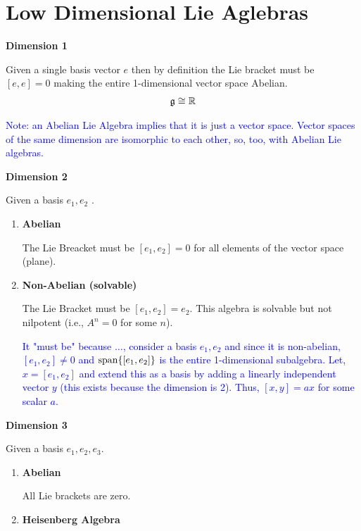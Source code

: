 \documentclass[12pt,a4paper]{report}
\newcommand{\BLUE}[1]{\textcolor{blue}{#1}}
\begin{document}
\chapter{Low Dimensional Lie Aglebras}

\begin{description}
	\item \textbf{Dimension 1}

	Given a single basis vector $e$ then by definition the Lie bracket must be $[e,e]=0$	making the entire 1-dimensional vector space Abelian.
	\begin{align*}
		\mathfrak{g} \cong \mathbb{R}
	\end{align*}
	
	\BLUE{Note: an Abelian Lie Algebra implies that it is just a vector space.  Vector spaces of the same dimension are isomorphic to each other, so, too, with Abelian Lie algebras.}
	
	\item \textbf{Dimension 2}
	
	Given a basis $e_1, e_2$ .
	\begin{enumerate}
		\item \textbf{Abelian}
		
			The Lie Breacket must be $[e_1, e_2]=0$ for all elements of the vector space (plane).
		
		\item \textbf{Non-Abelian (solvable)}
		
			The Lie Bracket must be $[e_1,e_2] = e_2$.  This algebra is solvable but not nilpotent (i.e., $A^n=0$ for some $n$).
			
			\BLUE{It "must be" because $\dots$, consider a basis $e_1, e_2$ and since it is non-abelian, $[e_1,e_2] \ne 0$ and $\operatorname{span}\{[e_1,e_2]\}$ is the entire 1-dimensional subalgebra. Let, $x = [e_1,e_2]$ and extend this as a basis by adding a linearly independent vector $y$ (this exists because the dimension is 2).  Thus, $[x,y]=ax$ for some scalar $a$.
			}
			
	\end{enumerate}
	\item \textbf{Dimension 3}
	
	Given a basis $e_1, e_2, e_3$.
	
	\begin{enumerate}
		\item \textbf{Abelian}
		
		All Lie brackets are zero.
		
		\item \textbf{Heisenberg Algebra}	
		

\end{enumerate}
\end{description}
\end{document}
